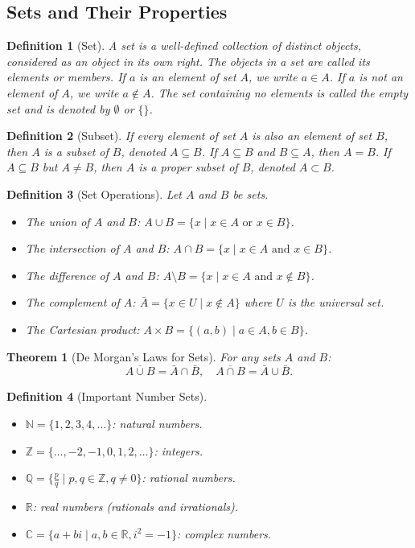 \documentclass[11pt,a4paper]{article}
\newtheorem{theorem}{Theorem}
\newtheorem{definition}{Definition}
\begin{document}
\subsection{Sets and Their Properties}
\begin{definition}[Set]
A \textit{set} is a well-defined collection of distinct objects, considered as an object in its own right. The objects in a set are called its \textit{elements} or \textit{members}. If $a$ is an element of set $A$, we write $a \in A$. If $a$ is not an element of $A$, we write $a \notin A$. The set containing no elements is called the \textit{empty set} and is denoted by $\emptyset$ or $\{\}$.
\end{definition}
\begin{definition}[Subset]
If every element of set $A$ is also an element of set $B$, then $A$ is a \textit{subset} of $B$, denoted $A \subseteq B$. If $A \subseteq B$ and $B \subseteq A$, then $A = B$. If $A \subseteq B$ but $A \neq B$, then $A$ is a \textit{proper subset} of $B$, denoted $A \subset B$.
\end{definition}
\begin{definition}[Set Operations]
Let $A$ and $B$ be sets.
\begin{itemize}
\item The \textit{union} of $A$ and $B$: $A \cup B = \{x \mid x \in A \text{ or } x \in B\}$.
\item The \textit{intersection} of $A$ and $B$: $A \cap B = \{x \mid x \in A \text{ and } x \in B\}$.
\item The \textit{difference} of $A$ and $B$: $A \setminus B = \{x \mid x \in A \text{ and } x \notin B\}$.
\item The \textit{complement} of $A$: $\bar{A} = \{x \in U \mid x \notin A\}$ where $U$ is the universal set.
\item The \textit{Cartesian product}: $A \times B = \{(a, b) \mid a \in A, b \in B\}$.
\end{itemize}
\end{definition}
\begin{theorem}[De Morgan's Laws for Sets]
For any sets $A$ and $B$:
\[
\overline{A \cup B} = \bar{A} \cap \bar{B}, \quad \overline{A \cap B} = \bar{A} \cup \bar{B}.
\]
\end{theorem}
\begin{definition}[Important Number Sets]
\begin{itemize}
\item $\mathbb{N} = \{1, 2, 3, 4, \dots\}$: natural numbers.
\item $\mathbb{Z} = \{\dots, -2, -1, 0, 1, 2, \dots\}$: integers.
\item $\mathbb{Q} = \{\frac{p}{q} \mid p, q \in \mathbb{Z}, q \neq 0\}$: rational numbers.
\item $\mathbb{R}$: real numbers (rationals and irrationals).
\item $\mathbb{C} = \{a + bi \mid a, b \in \mathbb{R}, i^2 = -1\}$: complex numbers.
\end{itemize}
\end{definition}
\end{document}
